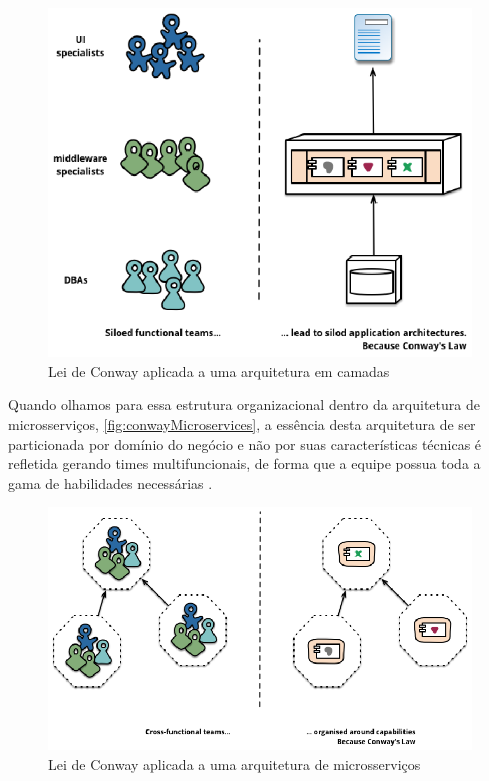 \begin{figure}[h]
  \centering
  \includegraphics[keepaspectratio=true,scale=1]{figuras/conwayMonolithic.eps}
  \caption{Lei de Conway aplicada a uma arquitetura em camadas\label{fig:conwayMonolithic} }
\end{figure}

Quando olhamos para essa estrutura organizacional dentro da arquitetura de microsserviços,
\autoref{fig:conwayMicroservices}, a essência desta arquitetura de ser particionada por domínio
do negócio e não por suas características técnicas é refletida gerando times multifuncionais, de
forma que a equipe possua toda a gama de habilidades necessárias \cite{MartinFowler:Microservices}.

\begin{figure}[h]
  \centering
  \includegraphics[keepaspectratio=true,scale=1]{figuras/conwayMicroservices.eps}
  \caption{Lei de Conway aplicada a uma arquitetura de microsserviços\label{fig:conwayMicroservices} }
\end{figure}

